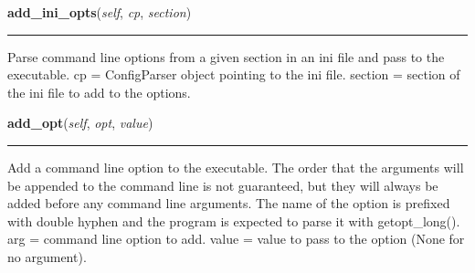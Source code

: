    \label{pipeline:CondorJob:add_ini_opts}
    \vspace{0.5ex}

    \noindent\begin{boxedminipage}{\textwidth}

    \raggedright \textbf{add\_ini\_opts}(\textit{self}, \textit{cp}, \textit{section})

    \vspace{-1.5ex}

    \rule{\textwidth}{0.5\fboxrule}
    Parse command line options from a given section in an ini file and 
    pass to the executable. cp = ConfigParser object pointing to the ini 
    file. section = section of the ini file to add to the options.

    \vspace{1ex}

    \end{boxedminipage}

    \label{pipeline:CondorJob:add_opt}
    \vspace{0.5ex}

    \noindent\begin{boxedminipage}{\textwidth}

    \raggedright \textbf{add\_opt}(\textit{self}, \textit{opt}, \textit{value})

    \vspace{-1.5ex}

    \rule{\textwidth}{0.5\fboxrule}
    Add a command line option to the executable. The order that the 
    arguments will be appended to the command line is not guaranteed, but 
    they will always be added before any command line arguments. The name 
    of the option is prefixed with double hyphen and the program is 
    expected to parse it with getopt\_long(). arg = command line option 
    to add. value = value to pass to the option (None for no argument).

    \vspace{1ex}

    \end{boxedminipage}

    \label{pipeline:CondorJob:get_stderr_file}
    \vspace{0.5ex}

